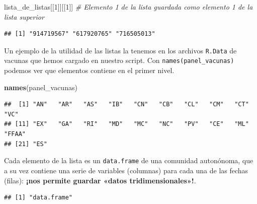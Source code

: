 \documentclass[11pt,]{book}
\newenvironment{Shaded}{\begin{snugshade}}{\end{snugshade}}
\newcommand{\CommentTok}[1]{\textcolor[rgb]{0.37,0.37,0.37}{\textit{#1}}}
\newcommand{\DecValTok}[1]{\textcolor[rgb]{0.06,0.06,0.06}{#1}}
\newcommand{\KeywordTok}[1]{\textcolor[rgb]{0.27,0.27,0.27}{\textbf{#1}}}
\newcommand{\NormalTok}[1]{#1}
\newcommand{\OperatorTok}[1]{\textcolor[rgb]{0.43,0.43,0.43}{\textbf{#1}}}
\begin{document}
\begin{Shaded}
\begin{Highlighting}[]
\NormalTok{lista_de_listas[[}\DecValTok{1}\NormalTok{]][[}\DecValTok{1}\NormalTok{]] }\CommentTok{# Elemento 1 de la lista guardada como elemento 1 de la lista superior}
\end{Highlighting}
\end{Shaded}

\begin{verbatim}
## [1] "914719567" "617920765" "716505013"
\end{verbatim}

Un ejemplo de la utilidad de las listas la tenemos en los archivos \texttt{R.Data} de vacunas que hemos cargado en nuestro script. Con \texttt{names(panel\_vacunas)} podemos ver que elementos contiene en el primer nivel.

\begin{Shaded}
\begin{Highlighting}[]
\KeywordTok{names}\NormalTok{(panel_vacunas)}
\end{Highlighting}
\end{Shaded}

\begin{verbatim}
##  [1] "AN"   "AR"   "AS"   "IB"   "CN"   "CB"   "CL"   "CM"   "CT"   "VC"  
## [11] "EX"   "GA"   "RI"   "MD"   "MC"   "NC"   "PV"   "CE"   "ML"   "FFAA"
## [21] "ES"
\end{verbatim}

Cada elemento de la lista es un \texttt{data.frame} de una comunidad autonónoma, que a su vez contiene una serie de variables (columnas) para cada una de las fechas (filas): \textbf{¡nos permite guardar «datos tridimensionales»!}.

\begin{Shaded}
\end{Shaded}

\begin{verbatim}
## [1] "data.frame"
\end{verbatim}

\begin{Shaded}
\end{Shaded}
\end{document}

